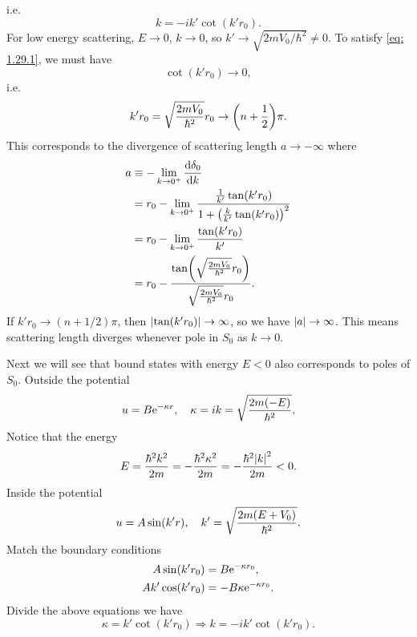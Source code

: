 \documentclass[10pt]{article}
\begin{document}
	i.e.
	\begin{equation}
		k = -i k' \cot(k' r_0).
	\end{equation}
	For low energy scattering, $E \to 0$, $k\to 0$, so $k' \to \sqrt{2mV_0/\hbar^2} \neq 0$. To satisfy \eqref{eq: 1.29.1}, we must have
	\begin{equation}
		\cot(k' r_0) \to 0,
	\end{equation}
	i.e.
	\begin{equation}
		k' r_0 = \sqrt{\frac{2mV_0}{\hbar^2}} r_0 \to \qty(n + \frac{1}{2}) \pi.
	\end{equation}
	This corresponds to the divergence of scattering length $a \to - \infty$ where
	\begin{align*}
		a &\equiv -\lim_{k \to 0^+} \dv{\delta_0}{k} \\
		&= r_0 - \lim_{k \to 0^+} \frac{\frac{1}{k'}\tan(k'r_0)}{1 + \qty(\frac{k}{k'}\tan(k'r_0))^2} \\
		&= r_0 - \lim_{k \to 0^+} \frac{\tan(k'r_0)}{k'} \\
		&= r_0 - \frac{\tan(\sqrt{\frac{2mV_0}{\hbar^2}} r_0)}{\sqrt{\frac{2mV_0}{\hbar^2}} r_0}.
	\end{align*}
	If $k' r_0 \to (n + 1/2) \pi$, then $\abs{\tan(k'r_0)} \to \infty$, so we have $\abs{a} \to \infty$. This means scattering length diverges whenever pole in $S_0$ as $k \to 0$.

	Next we will see that bound states with energy $E < 0$ also corresponds to poles of $S_0$. Outside the potential
	\begin{equation}
		u = B \e^{- \kappa r}\qc \kappa = ik = \sqrt{\frac{2m(-E)}{\hbar^2}},
	\end{equation}
	Notice that the energy
	\begin{equation}
		E = \frac{\hbar^2 k^2}{2m} = - \frac{\hbar^2 \kappa^2}{2m} = - \frac{\hbar^2 \abs{k}^2}{2m} < 0.
	\end{equation}
	Inside the potential
	\begin{equation}
		u = A \sin(k' r)\qc k' = \sqrt{\frac{2m(E + V_0)}{\hbar^2}}.
	\end{equation}
	Match the boundary conditions
	\begin{align*}
		A \sin(k' r_0) &= B {\mathrm{e}}^{- \kappa r_0}, \\
		A k' \cos(k' r_0) &= - B \kappa {\mathrm{e}}^{- \kappa r_0}.
	\end{align*}
	Divide the above equations we have
	\begin{equation}
		\kappa = k' \cot(k' r_0) \Longrightarrow k = -i k' \cot(k' r_0).
	\end{equation}
	
\end{document}
